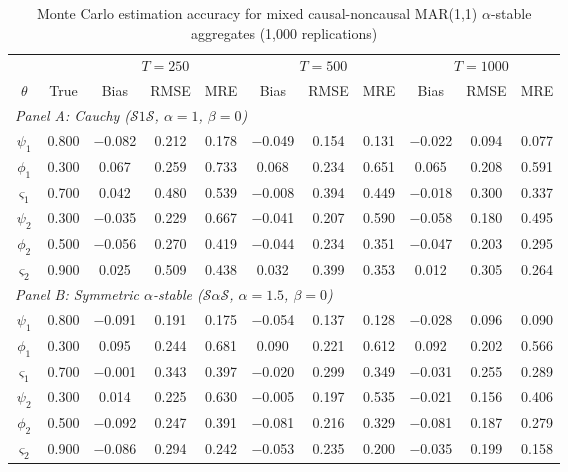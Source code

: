 \begin{table}[!h]
\centering
\caption{Monte Carlo estimation accuracy for mixed causal-noncausal MAR(1{,}1) $\alpha$-stable aggregates (1{,}000 replications)}
\label{tab:mc_accuracy_mar11}
\begin{tabular}{ccccccccccc}
\toprule
& & \multicolumn{3}{c}{$T = 250$} & \multicolumn{3}{c}{$T = 500$} & \multicolumn{3}{c}{$T = 1000$} \\
\cmidrule(lr){3-5} \cmidrule(lr){6-8} \cmidrule(lr){9-11}
$\theta$ & True & Bias & RMSE & MRE & Bias & RMSE & MRE & Bias & RMSE & MRE \\
\midrule
\multicolumn{11}{l}{\textit{Panel A: Cauchy ($\mathcal{S}1\mathcal{S}$, $\alpha = 1$, $\beta = 0$)}} \\[3pt]
$\psi_1$ & 0.800 & $-$0.082 & 0.212 & 0.178 & $-$0.049 & 0.154 & 0.131 & $-$0.022 & 0.094 & 0.077 \\
$\phi_1$ & 0.300 & 0.067 & 0.259 & 0.733 & 0.068 & 0.234 & 0.651 & 0.065 & 0.208 & 0.591 \\
$\varsigma_{1}$ & 0.700 & 0.042 & 0.480 & 0.539 & $-$0.008 & 0.394 & 0.449 & $-$0.018 & 0.300 & 0.337 \\
$\psi_2$ & 0.300 & $-$0.035 & 0.229 & 0.667 & $-$0.041 & 0.207 & 0.590 & $-$0.058 & 0.180 & 0.495 \\
$\phi_2$ & 0.500 & $-$0.056 & 0.270 & 0.419 & $-$0.044 & 0.234 & 0.351 & $-$0.047 & 0.203 & 0.295 \\
$\varsigma_{2}$ & 0.900 & 0.025 & 0.509 & 0.438 & 0.032 & 0.399 & 0.353 & 0.012 & 0.305 & 0.264 \\[6pt]
\multicolumn{11}{l}{\textit{Panel B: Symmetric $\alpha$-stable ($\mathcal{S}\alpha\mathcal{S}$, $\alpha = 1.5$, $\beta = 0$)}} \\[3pt]
$\psi_1$ & 0.800 & $-$0.091 & 0.191 & 0.175 & $-$0.054 & 0.137 & 0.128 & $-$0.028 & 0.096 & 0.090 \\
$\phi_1$ & 0.300 & 0.095 & 0.244 & 0.681 & 0.090 & 0.221 & 0.612 & 0.092 & 0.202 & 0.566 \\
$\varsigma_{1}$ & 0.700 & $-$0.001 & 0.343 & 0.397 & $-$0.020 & 0.299 & 0.349 & $-$0.031 & 0.255 & 0.289 \\
$\psi_2$ & 0.300 & 0.014 & 0.225 & 0.630 & $-$0.005 & 0.197 & 0.535 & $-$0.021 & 0.156 & 0.406 \\
$\phi_2$ & 0.500 & $-$0.092 & 0.247 & 0.391 & $-$0.081 & 0.216 & 0.329 & $-$0.081 & 0.187 & 0.279 \\
$\varsigma_{2}$ & 0.900 & $-$0.086 & 0.294 & 0.242 & $-$0.053 & 0.235 & 0.200 & $-$0.035 & 0.199 & 0.158 \\

\end{tabular}
\end{table}
